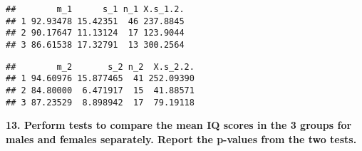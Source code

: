 \documentclass[
]{article}
\newenvironment{Shaded}{\begin{snugshade}}{\end{snugshade}}
\newcommand{\DecValTok}[1]{\textcolor[rgb]{0.00,0.00,0.81}{#1}}
\newcommand{\KeywordTok}[1]{\textcolor[rgb]{0.13,0.29,0.53}{\textbf{#1}}}
\newcommand{\NormalTok}[1]{#1}
\newcommand{\OperatorTok}[1]{\textcolor[rgb]{0.81,0.36,0.00}{\textbf{#1}}}
\newcommand{\StringTok}[1]{\textcolor[rgb]{0.31,0.60,0.02}{#1}}
\begin{document}
\begin{verbatim}
##        m_1      s_1 n_1 X.s_1.2.
## 1 92.93478 15.42351  46 237.8845
## 2 90.17647 11.13124  17 123.9044
## 3 86.61538 17.32791  13 300.2564
\end{verbatim}

\begin{Shaded}
\end{Shaded}

\begin{verbatim}
##        m_2       s_2 n_2  X.s_2.2.
## 1 94.60976 15.877465  41 252.09390
## 2 84.80000  6.471917  15  41.88571
## 3 87.23529  8.898942  17  79.19118
\end{verbatim}

\textbf{13. Perform tests to compare the mean IQ scores in the 3 groups
for males and females separately. Report the p-values from the two
tests.}

\begin{Shaded}
\end{Shaded}
\end{document}
